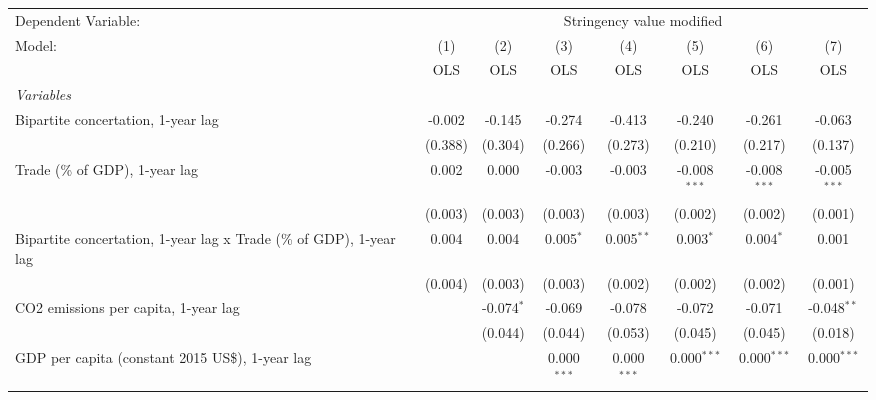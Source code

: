 
\begingroup
\centering
\begin{tabular}{lccccccc}
   \toprule
   Dependent Variable: & \multicolumn{7}{c}{Stringency value modified}\\
   Model:                                                              & (1)     & (2)          & (3)           & (4)           & (5)            & (6)            & (7)\\  
                                                                       &  OLS    & OLS          & OLS           & OLS           & OLS            & OLS            & OLS\\  
   \midrule
   \emph{Variables}\\
   Bipartite concertation, 1-year lag                                  & -0.002  & -0.145       & -0.274        & -0.413        & -0.240         & -0.261         & -0.063\\   
                                                                       & (0.388) & (0.304)      & (0.266)       & (0.273)       & (0.210)        & (0.217)        & (0.137)\\   
   Trade (\% of GDP), 1-year lag                                       & 0.002   & 0.000        & -0.003        & -0.003        & -0.008$^{***}$ & -0.008$^{***}$ & -0.005$^{***}$\\   
                                                                       & (0.003) & (0.003)      & (0.003)       & (0.003)       & (0.002)        & (0.002)        & (0.001)\\   
   Bipartite concertation, 1-year lag x Trade (\% of GDP), 1-year lag  & 0.004   & 0.004        & 0.005$^{*}$   & 0.005$^{**}$  & 0.003$^{*}$    & 0.004$^{*}$    & 0.001\\   
                                                                       & (0.004) & (0.003)      & (0.003)       & (0.002)       & (0.002)        & (0.002)        & (0.001)\\   
   CO2 emissions per capita, 1-year lag                                &         & -0.074$^{*}$ & -0.069        & -0.078        & -0.072         & -0.071         & -0.048$^{**}$\\   
                                                                       &         & (0.044)      & (0.044)       & (0.053)       & (0.045)        & (0.045)        & (0.018)\\   
   GDP per capita (constant 2015 US\$), 1-year lag                     &         &              & 0.000$^{***}$ & 0.000$^{***}$ & 0.000$^{***}$  & 0.000$^{***}$  & 0.000$^{***}$\\   

\end{tabular}
